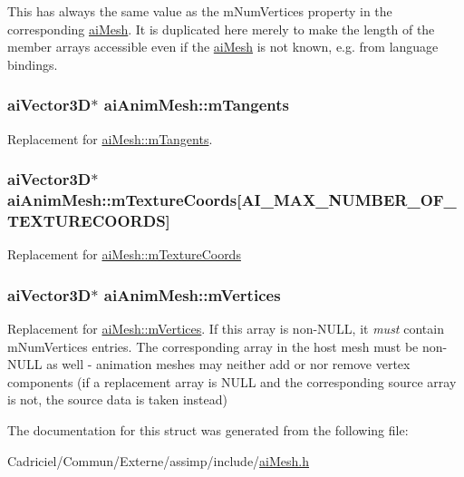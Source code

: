 This has always the same value as the m\-Num\-Vertices property in the corresponding \hyperlink{structai_mesh}{ai\-Mesh}. It is duplicated here merely to make the length of the member arrays accessible even if the \hyperlink{structai_mesh}{ai\-Mesh} is not known, e.\-g. from language bindings. \hypertarget{structai_anim_mesh_a95dcc49c6d5ecc570ceb54552a0a9625}{
\subsubsection[{m\-Tangents}]{ {\bf ai\-Vector3\-D}$\ast$ ai\-Anim\-Mesh\-::m\-Tangents}}\label{structai_anim_mesh_a95dcc49c6d5ecc570ceb54552a0a9625}
Replacement for \hyperlink{structai_mesh_af367ff78bd69f3e83d7edc8ad67dc5df}{ai\-Mesh\-::m\-Tangents}. \hypertarget{structai_anim_mesh_ad24a0451adeb845a53eb2351b9462e0a}{
\subsubsection[{m\-Texture\-Coords}]{ {\bf ai\-Vector3\-D}$\ast$ ai\-Anim\-Mesh\-::m\-Texture\-Coords\mbox{[}{\bf A\-I\-\_\-\-M\-A\-X\-\_\-\-N\-U\-M\-B\-E\-R\-\_\-\-O\-F\-\_\-\-T\-E\-X\-T\-U\-R\-E\-C\-O\-O\-R\-D\-S}\mbox{]}}}\label{structai_anim_mesh_ad24a0451adeb845a53eb2351b9462e0a}
Replacement for \hyperlink{structai_mesh_a4a50b11d00ef50f419c75cab0f6bddd6}{ai\-Mesh\-::m\-Texture\-Coords} \hypertarget{structai_anim_mesh_a0ac2dd4c1afd23e6a9293b1d0ded3060}{
\subsubsection[{m\-Vertices}]{ {\bf ai\-Vector3\-D}$\ast$ ai\-Anim\-Mesh\-::m\-Vertices}}\label{structai_anim_mesh_a0ac2dd4c1afd23e6a9293b1d0ded3060}
Replacement for \hyperlink{structai_mesh_afd4588abb3e1c72821ae0234a3850662}{ai\-Mesh\-::m\-Vertices}. If this array is non-\/\-N\-U\-L\-L, it {\itshape must} contain m\-Num\-Vertices entries. The corresponding array in the host mesh must be non-\/\-N\-U\-L\-L as well -\/ animation meshes may neither add or nor remove vertex components (if a replacement array is N\-U\-L\-L and the corresponding source array is not, the source data is taken instead) 

The documentation for this struct was generated from the following file\-:\begin{DoxyCompactItemize}
\item 
Cadriciel/\-Commun/\-Externe/assimp/include/\hyperlink{ai_mesh_8h}{ai\-Mesh.\-h}\end{DoxyCompactItemize}
